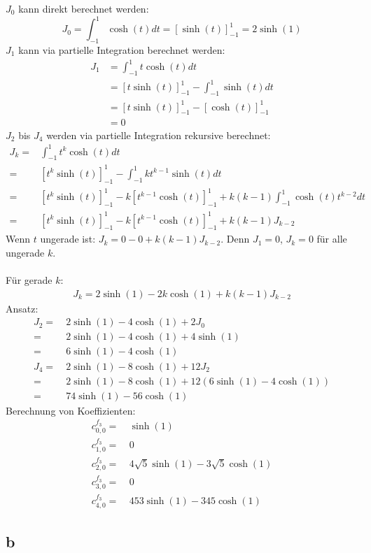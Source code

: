 $J_0$ kann direkt berechnet werden:
\begin{equation}
	J_0 = \int_{-1}^{1} \cosh (t)dt = \left[\sinh(t)\right]^1_{-1} = 2\sinh(1)
\end{equation}
$J_1$ kann via partielle Integration berechnet werden:
\begin{align}
	J_1 & = \int_{-1}^{1} t \cosh(t) dt \\
	 	& = \left[t\sinh(t)\right]^{1}_{-1} - \int_{-1}^{1} \sinh(t) dt \\
	 	& = \left[t\sinh(t)\right]^{1}_{-1} - \left[\cosh(t)\right]^{1}_{-1} \\
	 	& = 0
\end{align}
$J_2$ bis $J_4$ werden via partielle Integration rekursive berechnet: 
\begin{align}
	J_k = & \int_{-1}^{1} t^k \cosh(t) dt \\
		= & \left[t^k\sinh(t)\right]_{-1}^{1} - \int_{-1}^{1}k t^{k-1} \sinh(t) dt \\
		= & \left[t^k\sinh(t)\right]_{-1}^{1} - k\left[t^{k-1}\cosh(t)\right]_{-1}^{1} + k(k-1)\int_{-1}^{1} \cosh(t)t^{k-2}dt \\
		= & \left[t^k\sinh(t)\right]_{-1}^{1} - k\left[t^{k-1}\cosh(t)\right]_{-1}^{1} + k(k-1)J_{k-2}
\end{align}
Wenn $t$ ungerade ist: $J_k = 0-0+k(k-1)J_{k-2}$. Denn $J_1 = 0$, $J_k = 0$ für alle ungerade $k$. \\\\
Für gerade $k$:
\begin{align}
	J_k = 2\sinh(1) - 2k\cosh(1) + k(k-1)J_{k-2} 
\end{align}
Ansatz:
\begin{align}
	J_2 = \ & 2\sinh(1) - 4\cosh(1) + 2J_0 \\
	= \ & 2\sinh(1) - 4\cosh(1) + 4 \sinh(1) \\
	= \ & 6\sinh(1) - 4\cosh(1) \\
	J_4 = \ & 2\sinh(1) - 8\cosh(1) + 12 J_2\\
		= \ & 2\sinh(1) - 8\cosh(1) + 12 (6\sinh(1) - 4\cosh(1))\\
		= \ & 74 \sinh(1) - 56\cosh(1)
\end{align}
Berechnung von Koeffizienten:
\begin{align}
	c_{0,0}^{f_3} = \ & \sinh(1) \\
	c_{1,0}^{f_3} = \ & 0 \\
	c_{2,0}^{f_3} = \ & 4\sqrt{5}\sinh(1) - 3\sqrt{5} \cosh(1) \\
	c_{3,0}^{f_3} = \ & 0 \\
	c_{4,0}^{f_3} = \ & 453\sinh(1) - 345\cosh(1)
\end{align}
\subsection{b}